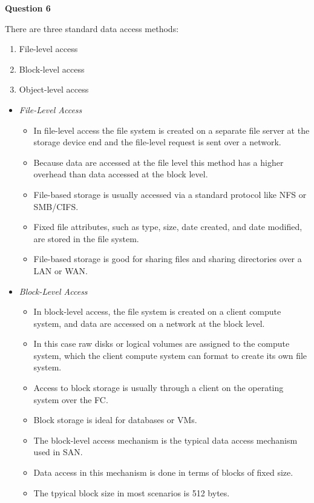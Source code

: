 \documentclass[a4paper, 12pt]{article}
\begin{document}
\newpage
\begin{center}
\textbf{Question 6}
\end{center}

There are three standard data access methods:
\begin{enumerate}
\item
File-level access
\item
Block-level access
\item
Object-level access
\end{enumerate}

\begin{itemize}
\item
\textit{File-Level Access}

\begin{itemize}
\item
In file-level access the file system is created on a separate file server at the storage device end and the file-level request is sent over a network.
\item
Because data are accessed at the file level this method has a higher overhead than data accessed at the block level.
\item
File-based storage is usually accessed via a standard protocol like NFS or SMB/CIFS.
\item
Fixed file attributes, such as type, size, date created, and date modified, are stored in the file system. 
\item
File-based storage is good for sharing files and sharing directories over a LAN or WAN.
\end{itemize}

\item
\textit{Block-Level Access}
\begin{itemize}
\item
In block-level access, the file system is created on a client compute system, and data are accessed on a network at the block level.
\item
In this case raw disks or logical volumes are assigned to the compute system, which the client compute system can format to create its own file system.
\item
Access to block storage is usually through a client on the operating system over the FC.
\item
Block storage is ideal for databases or VMs.
\item
The block-level access mechanism is the typical data access mechanism used in SAN.
\item
Data access in this mechanism is done in terms of blocks of fixed size.
\item
The tpyical block size in most scenarios is 512 bytes.
\end{itemize}


\end{itemize}
\end{document}
